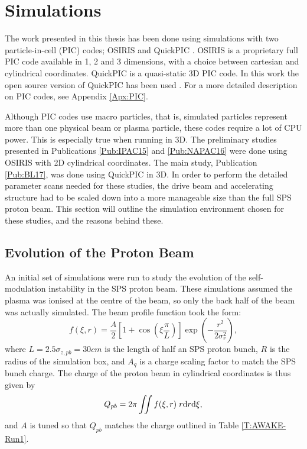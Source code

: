 %
%

\chapter{Simulations}
\label{Ch:Sim}

The work presented in this thesis has been done using simulations with two particle-in-cell (PIC) codes; OSIRIS \cite{fonseca:2002} and QuickPIC \cite{an:2013, huang:2006}. OSIRIS is a proprietary full PIC code available in 1, 2 and 3 dimensions, with a choice between cartesian and cylindrical coordinates. QuickPIC is a quasi-static 3D PIC code. In this work the open source version of QuickPIC has been used \cite{add:quickpic:web}. For a more detailed description on PIC codes, see Appendix \ref{Apx:PIC}.

Although PIC codes use macro particles, that is, simulated particles represent more than one physical beam or plasma particle, these codes require a lot of CPU power. This is especially true when running in 3D. The preliminary studies presented in Publications \ref{Pub:IPAC15} and \ref{Pub:NAPAC16} were done using OSIRIS with 2D cylindrical coordinates. The main study, Publication \ref{Pub:BL17}, was done using QuickPIC in 3D. In order to perform the detailed parameter scans needed for these studies, the drive beam and accelerating structure had to be scaled down into a more manageable size than the full SPS proton beam. This section will outline the simulation environment chosen for these studies, and the reasons behind these.

\section{Evolution of the Proton Beam}
\label{Sim:PBeam}

An initial set of simulations were run to study the evolution of the self-modulation instability in the SPS proton beam. These simulations assumed the plasma was ionised at the centre of the beam, so only the back half of the beam was actually simulated. The beam profile function took the form:
\begin{equation}
    f(\xi,r) = \frac{A}{2} \left[1 + \cos\left(\xi\frac{\pi}{L}\right)\right] \exp\left(-\frac{r^{2}}{2\sigma_{r}^{2}}\right), \label{EQ:SPS-Profile}
\end{equation}
where $L = 2.5\sigma_{z,pb} = 30\unit{cm}$ is the length of half an SPS proton bunch, $R$ is the radius of the simulation box, and $A_{q}$ is a charge scaling factor to match the SPS bunch charge. The charge of the proton beam in cylindrical coordinates is thus given by
\begin{equation}
    Q_{pb} = 2\pi \iint f(\xi,r) \;r \mathrm{d} r \mathrm{d} \xi, \label{EQ:SPS-Charge}
\end{equation}
and $A$ is tuned so that $Q_{pb}$ matches the charge outlined in Table \ref{T:AWAKE-Run1}.

